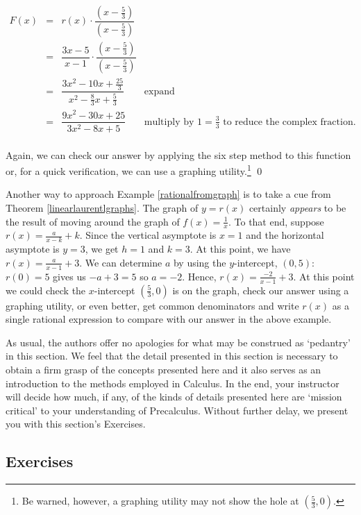 \documentclass{ximera}
\begin{document}
\begin{ex}
\[ \begin{array}{rclr}

F(x) & = &  r(x) \cdot \dfrac{\left(x - \frac{5}{3} \right)}{\left(x - \frac{5}{3} \right)} & \\
       & = &  \dfrac{3x-5}{x-1} \cdot \dfrac{\left(x - \frac{5}{3} \right)}{\left(x - \frac{5}{3} \right)} & \\
       & = & \dfrac{3x^2-10x+\frac{25}{3}}{x^2 - \frac{8}{3} x + \frac{5}{3}} & \text{expand}\\
       & = & \dfrac{9x^2-30x+25}{3x^2-8x+5} & \text{multiply by $1 = \frac{3}{3}$ to reduce the complex fraction.}\\ \end{array} \]

Again, we can check our answer by applying the six step method to this function or, for a quick verification, we can use a graphing utility.\footnote{Be warned, however, a graphing utility may not show the hole at  $\left(\frac{5}{3}, 0 \right)$.} \qed
 

\end{ex}

Another way to approach Example \ref{rationalfromgraph} is to take a cue from Theorem \ref{linearlaurentlgraphs}.  The graph of $y=r(x)$ certainly \textit{appears} to be the result of moving around the graph of $f(x) = \frac{1}{x}$.  To that end, suppose $r(x) = \frac{a}{x-k} + k$.  Since the vertical asymptote is $x=1$ and the horizontal asymptote is $y=3$, we get $h=1$ and $k=3$.  At this point, we have $r(x) = \frac{a}{x-1}+3$.  We can determine $a$ by using the $y$-intercept, $(0,5)$:  $r(0) =5$ gives us $-a+3 = 5$ so $a = -2$.  Hence, $r(x) = \frac{-2}{x-1}+3$.  At this point we could check the $x$-intercept  $\left(\frac{5}{3}, 0 \right)$ is on the graph, check our answer using a graphing utility, or even better, get common denominators and write $r(x)$ as a single rational expression to compare with our answer in the above example.  

As usual, the authors offer no apologies for what may be construed as `pedantry' in this section.  We feel that the detail presented in this section is necessary to obtain a firm grasp of the concepts presented here and it also serves as an introduction to the methods employed in Calculus. In the end,  your instructor will decide how much, if any, of the kinds of details presented here are `mission critical' to your understanding of Precalculus. Without further delay, we present you with this section's Exercises.

\newpage

\subsection{Exercises}


\closegraphsfile
\end{document}
